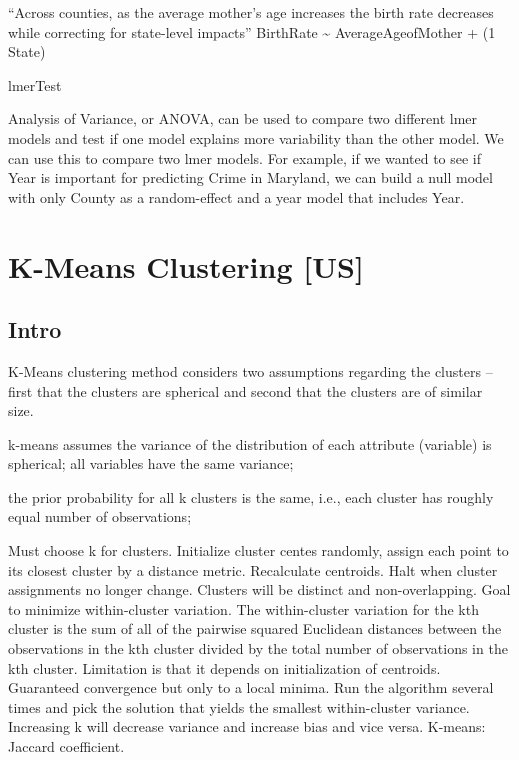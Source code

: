 \documentclass[]{book}
\theoremstyle{definition}
\theoremstyle{definition}
\theoremstyle{definition}
\theoremstyle{remark}
\begin{document}
``Across counties, as the average mother's age increases the birth rate
decreases while correcting for state-level impacts'' BirthRate
\textasciitilde{} AverageAgeofMother + (1 \textbar{} State)

lmerTest

Analysis of Variance, or ANOVA, can be used to compare two different
lmer models and test if one model explains more variability than the
other model. We can use this to compare two lmer models. For example, if
we wanted to see if Year is important for predicting Crime in Maryland,
we can build a null model with only County as a random-effect and a year
model that includes Year.

\section{K-Means Clustering {[}US{]}}\label{k-means-clustering-us}

\subsection{Intro}\label{intro-5}

K-Means clustering method considers two assumptions regarding the
clusters -- first that the clusters are spherical and second that the
clusters are of similar size.

k-means assumes the variance of the distribution of each attribute
(variable) is spherical; all variables have the same variance;

the prior probability for all k clusters is the same, i.e., each cluster
has roughly equal number of observations;

Must choose k for clusters. Initialize cluster centes randomly, assign
each point to its closest cluster by a distance metric. Recalculate
centroids. Halt when cluster assignments no longer change. Clusters will
be distinct and non-overlapping. Goal to minimize within-cluster
variation. The within-cluster variation for the kth cluster is the sum
of all of the pairwise squared Euclidean distances between the
observations in the kth cluster divided by the total number of
observations in the kth cluster. Limitation is that it depends on
initialization of centroids. Guaranteed convergence but only to a local
minima. Run the algorithm several times and pick the solution that
yields the smallest within-cluster variance. Increasing k will decrease
variance and increase bias and vice versa. K-means: Jaccard coefficient.
\end{document}
